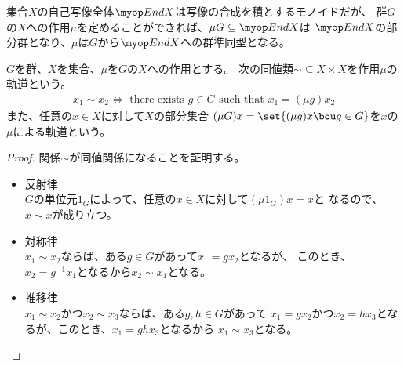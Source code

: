 	集合$X$の自己写像全体$\End X$は写像の合成を積とするモノイドだが、
	群$G$の$X$への作用$\mu$を定めることができれば、$\mu G\subseteq \End X$は
	$\End X$の部分群となり、$\mu$は$G$から$\End X$への群準同型となる。

	\begin{definition}[作用の軌道]\label{def:作用の軌道} %
		$G$を群、$X$を集合、$\mu$を$G$の$X$への作用とする。
		次の同値類$\sim\subseteq X\times X$を作用$\mu$の軌道という。
		\begin{equation*}\begin{split} %
			x_1\sim x_2 \iff \text{ there exists } g\in G \text{ such that }
			x_1 = (\mu g) x_2
		\end{split}\end{equation*} %
		また、任意の$x\in X$に対して$X$の部分集合
		$(\mu G)x=\set{(\mu g)x\bou g\in G}$を$x$の$\mu$による軌道という。
	\end{definition} %
	\begin{proof} %
		関係$\sim$が同値関係になることを証明する。
		\begin{itemize}\setlength{\itemsep}{-1mm} %
			\item 反射律 \\
			$G$の単位元$1_G$によって、任意の$x\in X$に対して$(\mu 1_G)x=x$と
			なるので、$x\sim x$が成り立つ。
			\item 対称律 \\
			$x_1\sim x_2$ならば、ある$g\in G$があって$x_1=gx_2$となるが、
			このとき、$x_2=g^{-1}x_1$となるから$x_2\sim x_1$となる。
			\item 推移律 \\
			$x_1\sim x_2$かつ$x_2\sim x_3$ならば、ある$g,h\in G$があって
			$x_1=gx_2$かつ$x_2=hx_3$となるが、このとき、$x_1=ghx_3$となるから
			$x_1\sim x_3$となる。
		\end{itemize} %
	\end{proof} %


